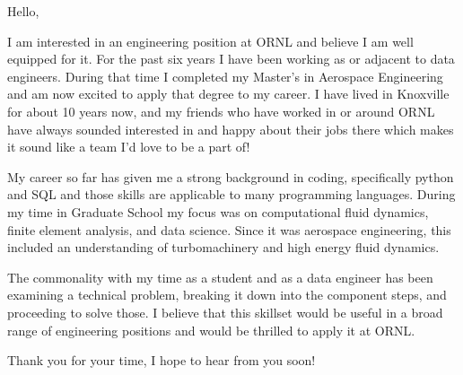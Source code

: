 \documentclass[11pt, a4paper]{awesome-cv}
\begin{document}
\makecvheader[L]

\begin{cvletter}

Hello,

I am interested in an engineering position at ORNL and believe I am well equipped for it. For the past six years I have been working as or adjacent to data engineers. During that time I completed my Master's in Aerospace Engineering and am now excited to apply that degree to my career. I have lived in Knoxville for about 10 years now, and my friends who have worked in or around ORNL have always sounded interested in and happy about their jobs there which makes it sound like a team I'd love to be a part of!

My career so far has given me a strong background in coding, specifically python and SQL and those skills are applicable to many programming languages. During my time in Graduate School my focus was on computational fluid dynamics, finite element analysis, and data science. Since it was aerospace engineering, this included an understanding of turbomachinery and high energy fluid dynamics.

The commonality with my time as a student and as a data engineer has been examining a technical problem, breaking it down into the component steps, and proceeding to solve those. I believe that this skillset would be useful in a broad range of engineering positions and would be thrilled to apply it at ORNL.

Thank you for your time, I hope to hear from you soon!

\end{cvletter}
\end{document}
